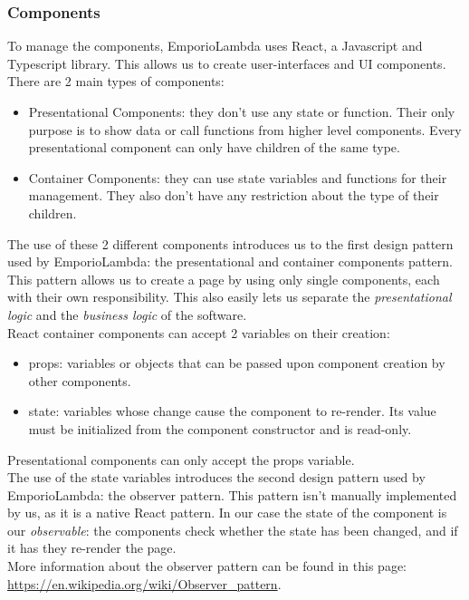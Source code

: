 \subsubsection{Components}
To manage the components, EmporioLambda uses React, a Javascript and Typescript library. This allows us to create user-interfaces and UI components.
There are 2 main types of components:
\begin{itemize}
\item Presentational Components: they don't use any state or function. Their only purpose is to show data or call functions from higher level components. Every presentational component can only have children of the same type.
\item Container Components: they can use state variables and functions for their management. They also don't have any restriction about the type of their children.
\end{itemize}
The use of these 2 different components introduces us to the first design pattern used by EmporioLambda: the presentational and container components pattern. This pattern allows us to create a page by using only single components, each with their own responsibility. This also easily lets us separate the \textit{presentational logic} and the \textit{business logic} of the software.\\
React container components can accept 2 variables on their creation:
\begin{itemize}
\item props: variables or objects that can be passed upon component creation by other components.
\item state: variables whose change cause the component to re-render. Its value must be initialized from the component constructor and is read-only.
\end{itemize}
Presentational components can only accept the props variable.\\
The use of the state variables introduces the second design pattern used by EmporioLambda: the observer pattern. This pattern isn't manually implemented by us, as it is a native React pattern. In our case the state of the component is our \textit{observable}: the components check whether the state has been changed, and if it has they re-render the page.\\ More information about the observer pattern can be found in this page: \url{https://en.wikipedia.org/wiki/Observer_pattern}.\\